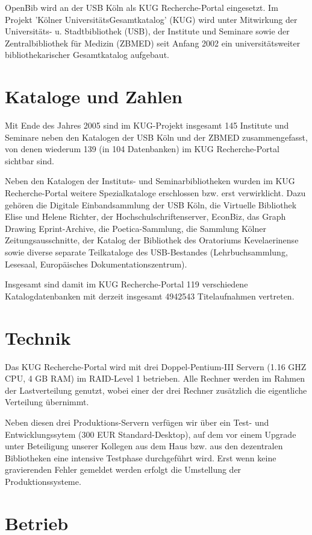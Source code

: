 \documentclass[11pt, twoside, a4paper, BCOR8mm, DIV12, bibtotoc,idxtotoc]{scrbook}
\begin{document}
OpenBib wird an der USB Köln als KUG Recherche-Portal eingesetzt. Im
Projekt 'Kölner UniversitätsGesamtkatalog' (KUG) wird unter Mitwirkung
der Universitäts- u. Stadtbibliothek (USB), der Institute und Seminare
sowie der Zentralbibliothek für Medizin (ZBMED) seit Anfang 2002 ein
universitätsweiter bibliothekarischer Gesamtkatalog aufgebaut.

\section{Kataloge und Zahlen}
Mit Ende des Jahres 2005 sind im KUG-Projekt insgesamt 145 Institute
und Seminare neben den Katalogen der USB Köln und der ZBMED
zusammengefasst, von denen wiederum 139 (in 104 Datenbanken) im KUG
Recherche-Portal sichtbar sind. 

Neben den Katalogen der Instituts- und Seminarbibliotheken wurden im
KUG Recherche-Portal weitere Spezialkataloge
erschlossen bzw. erst verwirklicht. Dazu gehören die Digitale
Einband\-samm\-lung der USB Köln, die Virtuelle Bibliothek Elise und
Helene Richter, der Hoch\-schul\-schrif\-ten\-ser\-ver, EconBiz, das Graph
Drawing Eprint-Archive, die Poetica-Sammlung, die Sammlung Kölner
Zeitungsausschnitte, der Katalog der  Bibliothek des Oratoriums
Kevelaerinense sowie diverse separate Teilkataloge des USB-Bestandes
(Lehrbuchsammlung, Lesesaal, Europäisches Do\-ku\-men\-ta\-tions\-zen\-trum).

Insgesamt sind damit im KUG Recherche-Portal 119 verschiedene
Katalogdatenbanken mit derzeit insgesamt 4942543 Titelaufnahmen
vertreten.

\section{Technik}
Das KUG Recherche-Portal wird mit drei Doppel-Pentium-III Servern
(1.16 GHZ CPU, 4 GB RAM) im RAID-Level 1 betrieben. Alle Rechner
werden im Rahmen der Lastverteilung genutzt, wobei einer der drei
Rechner zusätzlich die eigentliche Verteilung übernimmt.

Neben diesen drei Produktions-Servern verfügen wir über ein Test-
und Entwicklungssytem (300 EUR Standard-Desktop), auf dem vor einem
Upgrade unter Beteiligung unserer Kollegen aus dem Haus bzw. aus den
dezentralen Bibliotheken eine intensive Testphase durchgeführt wird.
Erst wenn keine gravierenden Fehler gemeldet werden erfolgt die
Umstellung der Produktionssysteme.

\section{Betrieb}
\end{document}
